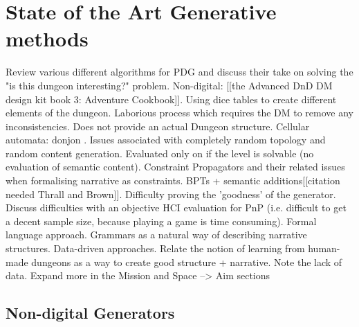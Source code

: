 \documentclass{UoYCSproject}
\begin{document}
\section{State of the Art Generative methods}
\begin{outline}
  \1 Review various different algorithms for PDG and discuss their take on solving the "is this dungeon interesting?" problem.
    \2 Non-digital: [[the Advanced DnD DM design kit book 3: Adventure Cookbook]]. Using dice tables to create different elements of the dungeon. Laborious process which requires the DM to remove any inconsistencies. Does not provide an actual Dungeon structure.
    \2 Cellular automata: donjon \parencite{donjonPDG}. Issues associated with completely random topology and random content generation. Evaluated only on if the level is solvable (no evaluation of semantic content).
    \2 Constraint Propagators and their related issues when formalising narrative as constraints.
    \2 BPTs + semantic additions[[citation needed Thrall and Brown]]. Difficulty proving the 'goodness' of the generator. Discuss difficulties with an objective HCI evaluation for PnP (i.e. difficult to get a decent sample size, because playing a game is time consuming).
    \2 Formal language approach. Grammars \parencite{DormansMS,Deery,Cadogan} as a natural way of describing narrative structures.
    \2 Data-driven approaches. \parencite{SummervilleLearningOfZelda,SummervillePCGML,SummervilleSamplingHyrule} Relate the notion of learning from human-made dungeons as a way to create good structure + narrative. Note the lack of data. Expand more in the Mission and Space --> Aim sections
\end{outline}



\subsection{Non-digital Generators}
\end{document}
